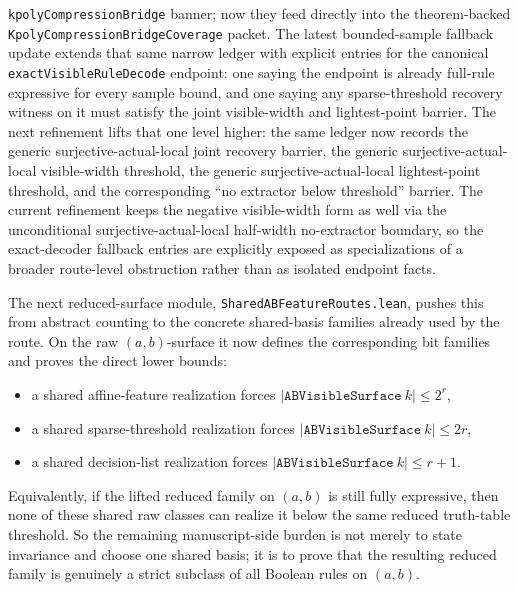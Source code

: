 \documentclass[11pt]{article}
\theoremstyle{remark}
\begin{document}
\texttt{kpolyCompressionBridge} banner; now they feed directly into the
theorem-backed \texttt{KpolyCompressionBridgeCoverage} packet.  The latest
bounded-sample fallback update extends that same narrow ledger with explicit
entries for the canonical \texttt{exactVisibleRuleDecode} endpoint: one saying
the endpoint is already full-rule expressive for every sample bound, and one
saying any sparse-threshold recovery witness on it must satisfy the joint
visible-width and lightest-point barrier.  The next refinement lifts that one
level higher: the same ledger now records the generic surjective-actual-local
joint recovery barrier, the generic surjective-actual-local visible-width
threshold, the generic surjective-actual-local lightest-point threshold, and
the corresponding ``no extractor below threshold'' barrier.  The current
refinement keeps the negative visible-width form as well via the unconditional
surjective-actual-local half-width no-extractor boundary, so the exact-decoder
fallback entries are explicitly exposed as specializations of a broader
route-level obstruction rather than as isolated endpoint facts.

The next reduced-surface module, \texttt{SharedABFeatureRoutes.lean}, pushes
this from abstract counting to the concrete shared-basis families already used
by the route.  On the raw \((a,b)\)-surface it now defines the corresponding
bit families and proves the direct lower bounds:
\begin{itemize}[leftmargin=1.5em]
  \item a shared affine-feature realization forces
  \(|\texttt{ABVisibleSurface}\ k| \le 2^r\),
  \item a shared sparse-threshold realization forces
  \(|\texttt{ABVisibleSurface}\ k| \le 2r\),
  \item a shared decision-list realization forces
  \(|\texttt{ABVisibleSurface}\ k| \le r+1\).
\end{itemize}
Equivalently, if the lifted reduced family on \((a,b)\) is still fully
expressive, then none of these shared raw classes can realize it below the
same reduced truth-table threshold.  So the remaining manuscript-side burden is
not merely to state invariance and choose one shared basis; it is to prove that
the resulting reduced family is genuinely a strict subclass of all Boolean
rules on \((a,b)\).
\end{document}

